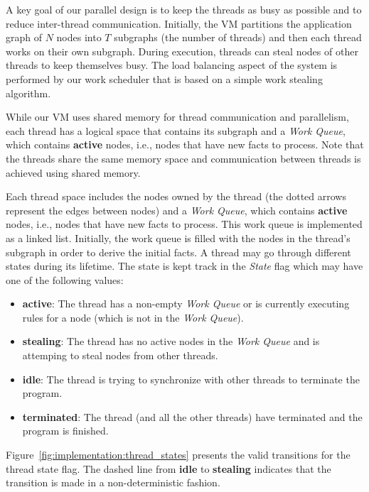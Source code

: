 A key goal of our parallel design is to keep the threads as busy as possible and
to reduce inter-thread communication. Initially, the VM partitions the
application graph of $N$ nodes into $T$ subgraphs (the number of threads) and
then each thread works on their own subgraph. During execution, threads can
steal nodes of other threads to keep themselves busy. The load balancing aspect
of the system is performed by our work scheduler that is based on a simple work
stealing algorithm.

While our VM uses shared memory for thread communication and parallelism, each
thread has a logical space that contains its subgraph and a \emph{Work Queue},
which contains \textbf{active} nodes, i.e., nodes that have new facts to
process. Note that the threads share the same memory space and communication
between threads is achieved using shared memory.

Each thread space includes the nodes owned by the thread (the dotted arrows
represent the edges between nodes) and a \emph{Work Queue}, which contains
\textbf{active} nodes, i.e., nodes that have new facts to process. This work
queue is implemented as a linked list. Initially, the work queue is filled with
the nodes in the thread's subgraph in order to derive the initial facts. A
thread may go through different states during its lifetime. The state is kept
track in the \emph{State} flag which may have one of the following values:

\begin{itemize}

   \item \textbf{active}: The thread has a non-empty \emph{Work Queue} or is
      currently executing rules for a node (which is not in the \emph{Work
      Queue}).

   \item \textbf{stealing}: The thread has no active nodes in the \emph{Work
      Queue} and is attemping to steal nodes from other
      threads.

   \item \textbf{idle}: The thread is trying to synchronize with other threads
      to terminate the program.
   
   \item \textbf{terminated}: The thread (and all the other threads) have
      terminated and the program is finished.

\end{itemize}

Figure~\ref{fig:implementation:thread_states} presents the valid transitions for
the thread state flag. The dashed line from \textbf{idle} to \textbf{stealing}
indicates that the transition is made in a non-deterministic fashion.

